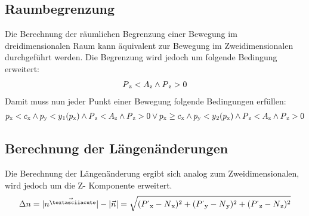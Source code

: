 \documentclass[a4paper, 12pt]{article}
\begin{document}
			\subsection{Raumbegrenzung}
			Die Berechnung der räumlichen Begrenzung einer Bewegung im dreidimensionalen Raum kann äquivalent zur Bewegung im Zweidimensionalen durchgeführt werden. Die Begrenzung wird jedoch um folgende Bedingung erweitert:
			\begin{align}
				P\textsubscript{z}<A\textsubscript{z}\land P\textsubscript{z}>0
			\end{align}
			Damit muss nun jeder Punkt einer Bewegung folgende Bedingungen erfüllen:
			\begin{align}
						p\textsubscript{x}<c\textsubscript{x} 
				\land 	p\textsubscript{y}<y\textsubscript{1}(p\textsubscript{x})
				\land	P\textsubscript{z}<A\textsubscript{z}
				\land 	P\textsubscript{z}>0 
				\lor
						p\textsubscript{x} \geq c\textsubscript{x} 
				\land 	p\textsubscript{y}<y\textsubscript{2}(p\textsubscript{x})
				\land	P\textsubscript{z}<A\textsubscript{z}
				\land 	P\textsubscript{z}>0
			\end{align}
			\subsection{Berechnung der Längenänderungen}
			Die Berechnung der Längenänderung ergibt sich analog zum Zweidimensionalen, wird jedoch um die Z- Komponente erweitert.
			\begin{align}
				\Delta n =
				|\vec{n^{´}}|-|\vec{n}|=
				\sqrt{
				(P^{`}\textsubscript{x}-N\textsubscript{x})^2+
				(P^{`}\textsubscript{y}-N\textsubscript{y})^2+
				(P^{`}\textsubscript{z}-N\textsubscript{z})^2
				}
			\end{align}	
\end{document}
